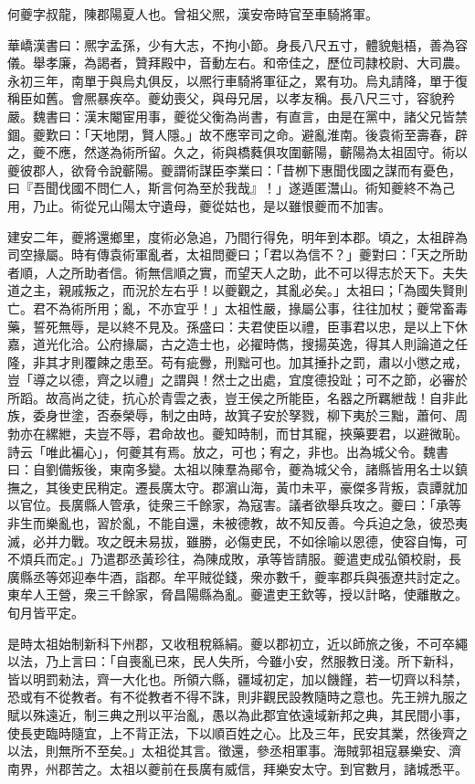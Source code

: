 
\begin{pinyinscope}
何夔字叔龍，陳郡陽夏人也。曾祖父熈，漢安帝時官至車騎將軍。

華嶠漢書曰：熈字孟孫，少有大志，不拘小節。身長八尺五寸，體貌魁梧，善為容儀。舉孝廉，為謁者，贊拜殿中，音動左右。和帝佳之，歷位司隷校尉、大司農。永初三年，南單于與烏丸俱反，以熈行車騎將軍征之，累有功。烏丸請降，單于復稱臣如舊。會熈暴疾卒。夔幼喪父，與母兄居，以孝友稱。長八尺三寸，容貌矜嚴。魏書曰：漢末閹宦用事，夔從父衡為尚書，有直言，由是在黨中，諸父兄皆禁錮。夔歎曰：「天地閉，賢人隱。」故不應宰司之命。避亂淮南。後袁術至壽春，辟之，夔不應，然遂為術所留。久之，術與橋蕤俱攻圍蘄陽，蘄陽為太祖固守。術以夔彼郡人，欲脅令說蘄陽。夔謂術謀臣李業曰：「昔栁下惠聞伐國之謀而有憂色，曰『吾聞伐國不問仁人，斯言何為至於我哉』！」遂遁匿灊山。術知夔終不為己用，乃止。術從兄山陽太守遺母，夔從姑也，是以雖恨夔而不加害。

建安二年，夔將還鄉里，度術必急追，乃間行得免，明年到本郡。頃之，太祖辟為司空掾屬。時有傳袁術軍亂者，太祖問夔曰；「君以為信不？」夔對曰：「天之所助者順，人之所助者信。術無信順之實，而望天人之助，此不可以得志於天下。夫失道之主，親戚叛之，而況於左右乎！以夔觀之，其亂必矣。」太祖曰；「為國失賢則亡。君不為術所用；亂，不亦宜乎！」太祖性嚴，掾屬公事，往往加杖；夔常畜毒藥，誓死無辱，是以終不見及。孫盛曰：夫君使臣以禮，臣事君以忠，是以上下休嘉，道光化洽。公府掾屬，古之造士也，必擢時儁，搜揚英逸，得其人則論道之任隆，非其才則覆餗之患至。苟有疵釁，刑黜可也。加其捶扑之罰，肅以小懲之戒，豈「導之以德，齊之以禮」之謂與！然士之出處，宜度德投趾；可不之節，必審於所蹈。故高尚之徒，抗心於青雲之表，豈王侯之所能臣，名器之所羈紲哉！自非此族，委身世塗，否泰榮辱，制之由時，故箕子安於孥戮，柳下夷於三黜，蕭何、周勃亦在縲紲，夫豈不辱，君命故也。夔知時制，而甘其寵，挾藥要君，以避微恥。詩云「唯此褊心」，何夔其有焉。放之，可也；宥之，非也。出為城父令。魏書曰：自劉備叛後，東南多變。太祖以陳羣為鄖令，夔為城父令，諸縣皆用名士以鎮撫之，其後吏民稍定。遷長廣太守。郡濵山海，黃巾未平，豪傑多背叛，袁譚就加以官位。長廣縣人管承，徒衆三千餘家，為寇害。議者欲舉兵攻之。夔曰：「承等非生而樂亂也，習於亂，不能自還，未被德教，故不知反善。今兵迫之急，彼恐夷滅，必并力戰。攻之旣未易拔，雖勝，必傷吏民，不如徐喻以恩德，使容自悔，可不煩兵而定。」乃遣郡丞黃珍往，為陳成敗，承等皆請服。夔遣吏成弘領校尉，長廣縣丞等郊迎奉牛酒，詣郡。牟平賊從錢，衆亦數千，夔率郡兵與張遼共討定之。東牟人王營，衆三千餘家，脅昌陽縣為亂。夔遣吏王欽等，授以計略，使離散之。旬月皆平定。

是時太祖始制新科下州郡，又收租稅緜絹。夔以郡初立，近以師旅之後，不可卒繩以法，乃上言曰：「自喪亂已來，民人失所，今雖小安，然服教日淺。所下新科，皆以明罰勑法，齊一大化也。所領六縣，疆域初定，加以饑饉，若一切齊以科禁，恐或有不從教者。有不從教者不得不誅，則非觀民設教隨時之意也。先王辨九服之賦以殊遠近，制三典之刑以平治亂，愚以為此郡宜依遠域新邦之典，其民間小事，使長吏臨時隨宜，上不背正法，下以順百姓之心。比及三年，民安其業，然後齊之以法，則無所不至矣。」太祖從其言。徵還，參丞相軍事。海賊郭祖寇暴樂安、濟南界，州郡苦之。太祖以夔前在長廣有威信，拜樂安太守。到官數月，諸城悉平。


\end{pinyinscope}
